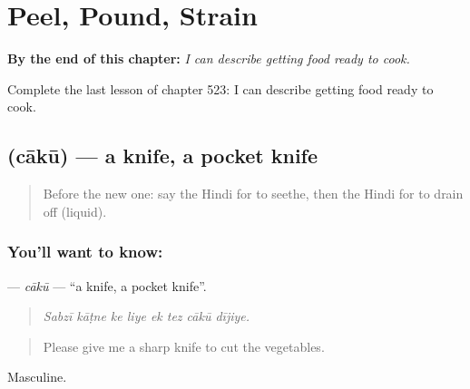 
\chapter{Peel, Pound, Strain}
\label{ch:hi-peel-pound-strain}

\begin{chapteropening}
\textbf{By the end of this chapter:} \emph{I can describe getting food ready to cook.}

Complete the last lesson of chapter 523: I can describe getting food ready to cook.
\end{chapteropening}

\section[\texorpdfstring{\hi{चाकू} (cākū)}{चाकू (cākū)}]{ (cākū) — a knife, a pocket knife}

\label{lesson:HI-C523-caku}



\begin{quote}
Before the new one: say the Hindi for to seethe, then the Hindi for to drain off (liquid).
\end{quote}

\subsection*{You'll want to know: }
\textbf{} — \emph{cākū} — \textquotedblleft{}a knife, a pocket knife\textquotedblright{}.

\begin{quote}
       
\end{quote}

\begin{quote}
\emph{Sabzī kāṭne ke liye ek tez cākū dījiye.}
\end{quote}

\begin{quote}
Please give me a sharp knife to cut the vegetables.
\end{quote}

Masculine.

